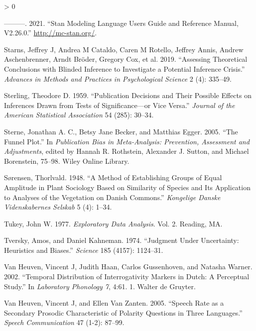 \documentclass[
  12pt,
]{article}
\newlength{\cslhangindent}
\newenvironment{CSLReferences}[2] %
 {%
  \setlength{\parindent}{0pt}
  \ifodd #1 \everypar{\setlength{\hangindent}{\cslhangindent}}\ignorespaces\fi
  \ifnum #2 > 0
  \setlength{\parskip}{#2\baselineskip}
  \fi
 }%
 {}
\begin{document}
\begin{CSLReferences}{1}{0}
\leavevmode\hypertarget{ref-stan2021}{}%
---------. 2021. {``Stan Modeling Language Users Guide and Reference Manual, V2.26.0.''} \url{http://mc-stan.org/}.

\leavevmode\hypertarget{ref-starns2019assessing}{}%
Starns, Jeffrey J, Andrea M Cataldo, Caren M Rotello, Jeffrey Annis, Andrew Aschenbrenner, Arndt Bröder, Gregory Cox, et al. 2019. {``Assessing Theoretical Conclusions with Blinded Inference to Investigate a Potential Inference Crisis.''} \emph{Advances in Methods and Practices in Psychological Science} 2 (4): 335--49.

\leavevmode\hypertarget{ref-sterling1959publication}{}%
Sterling, Theodore D. 1959. {``Publication Decisions and Their Possible Effects on Inferences Drawn from Tests of Significance---or Vice Versa.''} \emph{Journal of the American Statistical Association} 54 (285): 30--34.

\leavevmode\hypertarget{ref-sterne2005}{}%
Sterne, Jonathan A. C., Betsy Jane Becker, and Matthias Egger. 2005. {``The Funnel Plot.''} In \emph{Publication Bias in Meta-Analysis: Prevention, Assessment and Adjustments}, edited by Hannah R. Rothstein, Alexander J. Sutton, and Michael Borenstein, 75--98. Wiley Online Library.

\leavevmode\hypertarget{ref-sorensen1948}{}%
Sørensen, Thorlvald. 1948. {``A Method of Establishing Groups of Equal Amplitude in Plant Sociology Based on Similarity of Species and Its Application to Analyses of the Vegetation on {D}anish Commons.''} \emph{Kongelige Danske Videnskabernes Selskab} 5 (4): 1--34.

\leavevmode\hypertarget{ref-tukey1977exploratory}{}%
Tukey, John W. 1977. \emph{Exploratory Data Analysis}. Vol. 2. Reading, MA.

\leavevmode\hypertarget{ref-tversky1974judgment}{}%
Tversky, Amos, and Daniel Kahneman. 1974. {``Judgment Under Uncertainty: Heuristics and Biases.''} \emph{Science} 185 (4157): 1124--31.

\leavevmode\hypertarget{ref-heuven2002}{}%
Van Heuven, Vincent J, Judith Haan, Carlos Gussenhoven, and Natasha Warner. 2002. {``Temporal Distribution of Interrogativity Markers in {D}utch: A Perceptual Study.''} In \emph{Laboratory Phonology 7}, 4:61. 1. Walter de Gruyter.

\leavevmode\hypertarget{ref-van2005speech}{}%
Van Heuven, Vincent J, and Ellen Van Zanten. 2005. {``Speech Rate as a Secondary Prosodic Characteristic of Polarity Questions in Three Languages.''} \emph{Speech Communication} 47 (1-2): 87--99.


\end{CSLReferences}
\end{document}
